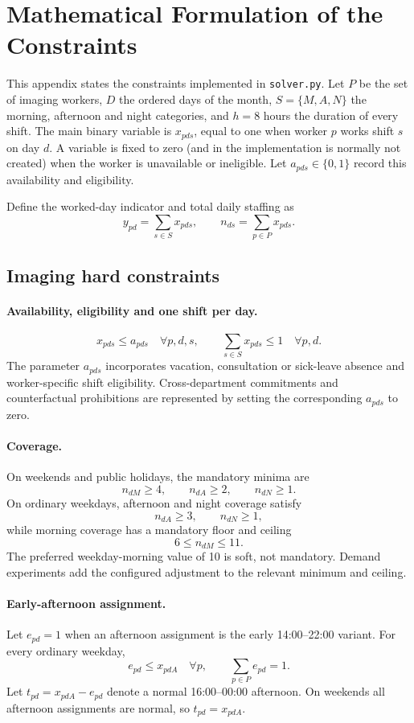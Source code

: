 \documentclass[11pt,a4paper]{article}
\newcommand{\code}[1]{\texttt{#1}}
\begin{document}
\appendix

\section{Mathematical Formulation of the Constraints}

This appendix states the constraints implemented in \code{solver.py}. Let $P$ be the set of imaging workers, $D$ the ordered days of the month, $S=\{M,A,N\}$ the morning, afternoon and night categories, and $h=8$ hours the duration of every shift. The main binary variable is $x_{pds}$, equal to one when worker $p$ works shift $s$ on day $d$. A variable is fixed to zero (and in the implementation is normally not created) when the worker is unavailable or ineligible. Let $a_{pds}\in\{0,1\}$ record this availability and eligibility.

Define the worked-day indicator and total daily staffing as
\[
 y_{pd}=\sum_{s\in S}x_{pds}, \qquad n_{ds}=\sum_{p\in P}x_{pds}.
\]

\subsection{Imaging hard constraints}

\paragraph{Availability, eligibility and one shift per day.}
\[
 x_{pds}\leq a_{pds}\quad\forall p,d,s,
 \qquad
 \sum_{s\in S}x_{pds}\leq1\quad\forall p,d.
\]
The parameter $a_{pds}$ incorporates vacation, consultation or sick-leave absence and worker-specific shift eligibility. Cross-department commitments and counterfactual prohibitions are represented by setting the corresponding $a_{pds}$ to zero.

\paragraph{Coverage.}
On weekends and public holidays, the mandatory minima are
\[
 n_{dM}\geq4,\qquad n_{dA}\geq2,\qquad n_{dN}\geq1.
\]
On ordinary weekdays, afternoon and night coverage satisfy
\[
 n_{dA}\geq3,\qquad n_{dN}\geq1,
\]
while morning coverage has a mandatory floor and ceiling
\[
 6\leq n_{dM}\leq11.
\]
The preferred weekday-morning value of 10 is soft, not mandatory. Demand experiments add the configured adjustment to the relevant minimum and ceiling.

\paragraph{Early-afternoon assignment.}
Let $e_{pd}=1$ when an afternoon assignment is the early 14:00--22:00 variant. For every ordinary weekday,
\[
 e_{pd}\leq x_{pdA}\quad\forall p,
 \qquad \sum_{p\in P}e_{pd}=1.
\]
Let $t_{pd}=x_{pdA}-e_{pd}$ denote a normal 16:00--00:00 afternoon. On weekends all afternoon assignments are normal, so $t_{pd}=x_{pdA}$.
\end{document}
